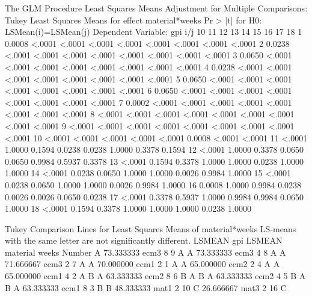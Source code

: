 \documentclass{article}
\begin{document}
\begin{Woutput}
The GLM Procedure
Least Squares Means
Adjustment for Multiple Comparisons: Tukey
                        Least Squares Means for effect material*weeks
                             Pr > |t| for H0: LSMean(i)=LSMean(j)
                                   Dependent Variable: gpi
i/j         10        11        12        13        14        15        16        17        18
   1    0.0008    <.0001    <.0001    <.0001    <.0001    <.0001    <.0001    <.0001    <.0001
   2    0.0238    <.0001    <.0001    <.0001    <.0001    <.0001    <.0001    <.0001    <.0001
   3    0.0650    <.0001    <.0001    <.0001    <.0001    <.0001    <.0001    <.0001    <.0001
   4    0.0238    <.0001    <.0001    <.0001    <.0001    <.0001    <.0001    <.0001    <.0001
   5    0.0650    <.0001    <.0001    <.0001    <.0001    <.0001    <.0001    <.0001    <.0001
   6    0.0650    <.0001    <.0001    <.0001    <.0001    <.0001    <.0001    <.0001    <.0001
   7    0.0002    <.0001    <.0001    <.0001    <.0001    <.0001    <.0001    <.0001    <.0001
   8    <.0001    <.0001    <.0001    <.0001    <.0001    <.0001    <.0001    <.0001    <.0001
   9    <.0001    <.0001    <.0001    <.0001    <.0001    <.0001    <.0001    <.0001    <.0001
  10              <.0001    <.0001    <.0001    <.0001    <.0001    0.0008    <.0001    <.0001
  11    <.0001              1.0000    0.1594    0.0238    0.0238    1.0000    0.3378    0.1594
  12    <.0001    1.0000              0.3378    0.0650    0.0650    0.9984    0.5937    0.3378
  13    <.0001    0.1594    0.3378              1.0000    1.0000    0.0238    1.0000    1.0000
  14    <.0001    0.0238    0.0650    1.0000              1.0000    0.0026    0.9984    1.0000
  15    <.0001    0.0238    0.0650    1.0000    1.0000              0.0026    0.9984    1.0000
  16    0.0008    1.0000    0.9984    0.0238    0.0026    0.0026              0.0650    0.0238
  17    <.0001    0.3378    0.5937    1.0000    0.9984    0.9984    0.0650              1.0000
  18    <.0001    0.1594    0.3378    1.0000    1.0000    1.0000    0.0238    1.0000

Tukey Comparison Lines for Least Squares Means of material*weeks
LS-means with the same letter are not significantly different.
                                                  LSMEAN
               gpi LSMEAN    material    weeks    Number
     A          73.333333    ecm3        8             9
     A
     A          73.333333    ecm3        4             8
     A
     A          71.666667    ecm3        2             7
     A
     A          70.000000    ecm1        2             1
     A
     A          65.000000    ecm2        2             4
     A
     A          65.000000    ecm1        4             2
     A
B    A          63.333333    ecm2        8             6
B    A
B    A          63.333333    ecm2        4             5
B    A
B    A          63.333333    ecm1        8             3
B
B               48.333333    mat1        2            10
     C          26.666667    mat3        2            16
     C


\end{Woutput}
\end{document}
